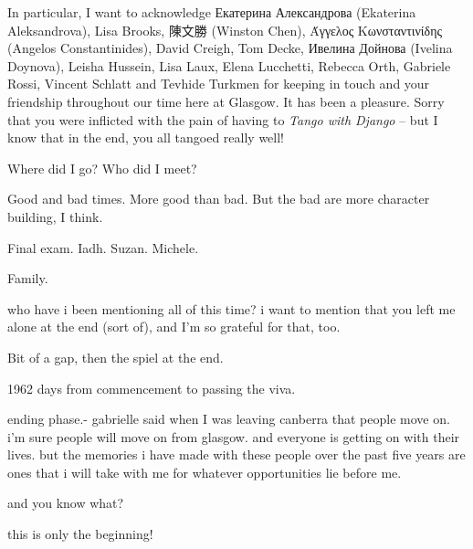 \begin{preamble}
In particular, I want to acknowledge Екатерина Александрова (Ekaterina Aleksandrova), Lisa Brooks, {\asianfont 陳文勝} (Winston Chen), Άγγελος Κωνσταντινίδης (Angelos Constantinides), David Creigh, Tom Decke, Ивелина Дойнова (Ivelina Doynova), Leisha Hussein, Lisa Laux, Elena Lucchetti, Rebecca Orth, Gabriele Rossi, Vincent Schlatt and Tevhide Turkmen for keeping in touch and your friendship throughout our time here at Glasgow. It has been a pleasure. Sorry that you were inflicted with the pain of having to \emph{Tango with Django} -- but I know that in the end, you all tangoed really well!

Where did I go? Who did I meet?

Good and bad times. More good than bad. But the bad are more character building, I think.

Final exam. Iadh. Suzan. Michele.

Family.

who have i been mentioning all of this time?
i want to mention that you left me alone at the end (sort of), and I'm so grateful for that, too.

\acksep

Bit of a gap, then the spiel at the end.

1962 days from commencement to passing the viva.

ending phase.- gabrielle said when I was leaving canberra that people move on.
i'm sure people will move on from glasgow. and everyone is getting on with their lives.
but the memories i have made with these people over the past five years are ones that i will take with me for whatever opportunities lie before me.

and you know what?

this is only the beginning!

\end{preamble}